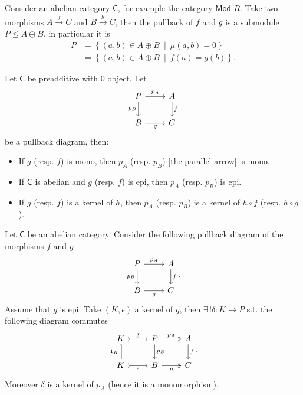\begin{ex}
	Consider an abelian category $\mathsf{C}$, for example the category $\mathsf{Mod}\text{-}R$.
	Take two morphisms $A \xrightarrow{f} C$ and $B \xrightarrow{g} C$, then the pullback of $f$ and $g$ is a submodule $P \leq A \oplus B$, in particular it is
	\begin{align}
		P &= \left\{ \left( a,b \right) \in A \oplus B \ \middle|\ \mu \left(a, b\right) = 0 \right\}\\
		  &= \left\{ \left(a, b\right) \in A \oplus B \ \middle|\ f(a) = g(b) \right\}
	.\end{align} 
\end{ex} 

\begin{prop}
	Let $\mathsf{C}$ be preadditive with $0$ object.
	Let 
	\begin{equation}
	\begin{tikzcd}
		P \arrow[r, "p_A", rightarrow] \arrow[d, "p_B"', rightarrow] & A \arrow[d, "f", rightarrow] \\
		B \arrow[r, "g"', rightarrow] & C
	\end{tikzcd}
	\end{equation} 
	be a pullback diagram, then:
	\begin{itemize}
		\item If $g$ (resp. $f$) is mono, then $p_A$ (resp. $p_B$) [the parallel arrow] is mono.
		\item If $\mathsf{C}$ is abelian and $g$ (resp. $f$) is epi, then $p_A$ (resp. $p_B$) is epi.
		\item If $g$ (resp. $f$) is a kernel of $h$, then $p_A$ (resp. $p_B$) is a kernel of $h \circ f$ (resp. $h \circ g$).
	\end{itemize}
\end{prop} 

\begin{ex}
	Let $\mathsf{C}$ be an abelian category.
	Consider the following pullback diagram of the morphisms $f$ and $g$
	\begin{equation}
	\begin{tikzcd}
		P \arrow[r, "p_A", rightarrow] \arrow[d, "p_B"', rightarrow] &
		A \arrow[d, "f", rightarrow] \\
		B \arrow[r, "g"', rightarrow] &
		C
	\end{tikzcd}
	.\end{equation} 
	Assume that $g$ is epi.
	Take $\left(K, \epsilon\right)$ a kernel of $g$, then
	$\exists\, ! \delta: K \to P$ s.t. the following diagram commutes
	\begin{equation}
	\begin{tikzcd}
		K \arrow[r, "\delta", tail] & %
		P \arrow[r, "p_A", twoheadrightarrow] \arrow[d, "p_B", rightarrow] &
		A \arrow[d, "f", rightarrow] \\
		K \arrow[r, "\epsilon"', tail] \arrow[u, "1_K", equal] &
		B \arrow[r, "g"', twoheadrightarrow] &
		C
	\end{tikzcd}
	.\end{equation} 
	Moreover $\delta$ is a kernel of $p_A$ (hence it is a monomorphism).
\end{ex} 

